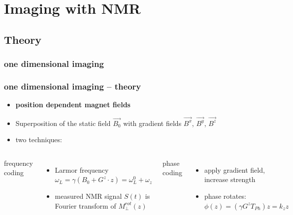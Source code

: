 \documentclass[aspectratio=169]{beamer}
\begin{document}
\section{Imaging with NMR}

\subsection{Theory}

\subsubsection{one dimensional imaging}

\begin{frame}
\frametitle{one dimensional imaging -- theory}
\begin{itemize}
\item \textbf{position dependent magnet fields}
\item Superposition of the static field $\vec{B_0}$ with gradient fields $\vec{B^x}$, $\vec{B^y}$, $\vec{B^z}$
\item two techniques:
\end{itemize}
\begin{columns}
\begin{description}
\item[frequency coding]
\end{description}
\begin{itemize}
\item Larmor frequency $\omega_L = \gamma (B_0 + G^z \cdot z) = \omega_L^0 + \omega_z$
\item measured NMR signal $S(t)$ is Fourier transform of $M_{\perp}^{rot}(z)$
\end{itemize}
\begin{description}
\item[phase coding]
\end{description}
\begin{itemize}
\item apply gradient field, increase strength
\item phase rotates: $\phi (z) = (\gamma G^z T_{Ph})z = k_z z$
\end{itemize}

\end{columns}	
\end{frame}
\end{document}
